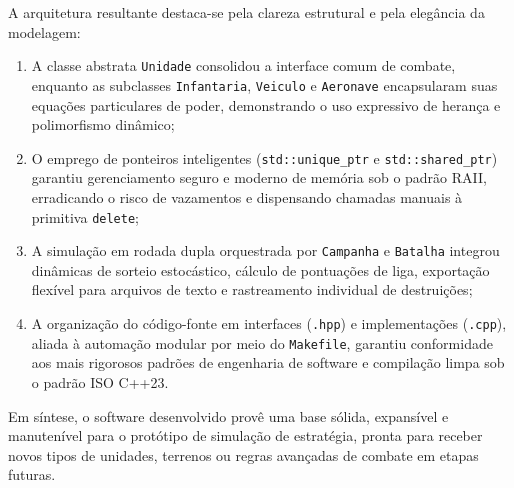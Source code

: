 \documentclass[12pt,a4paper]{article}
\begin{document}
A arquitetura resultante destaca-se pela clareza estrutural e pela elegância da modelagem:
\begin{enumerate}
    \item A classe abstrata \texttt{Unidade} consolidou a interface comum de combate, enquanto as subclasses \texttt{Infantaria}, \texttt{Veiculo} e \texttt{Aeronave} encapsularam suas equações particulares de poder, demonstrando o uso expressivo de herança e polimorfismo dinâmico;
    \item O emprego de ponteiros inteligentes (\texttt{std::unique\_ptr} e \texttt{std::shared\_ptr}) garantiu gerenciamento seguro e moderno de memória sob o padrão RAII, erradicando o risco de vazamentos e dispensando chamadas manuais à primitiva \texttt{delete};
    \item A simulação em rodada dupla orquestrada por \texttt{Campanha} e \texttt{Batalha} integrou dinâmicas de sorteio estocástico, cálculo de pontuações de liga, exportação flexível para arquivos de texto e rastreamento individual de destruições;
    \item A organização do código-fonte em interfaces (\texttt{.hpp}) e implementações (\texttt{.cpp}), aliada à automação modular por meio do \texttt{Makefile}, garantiu conformidade aos mais rigorosos padrões de engenharia de software e compilação limpa sob o padrão ISO C++23.
\end{enumerate}

Em síntese, o software desenvolvido provê uma base sólida, expansível e manutenível para o protótipo de simulação de estratégia, pronta para receber novos tipos de unidades, terrenos ou regras avançadas de combate em etapas futuras.
\end{document}
